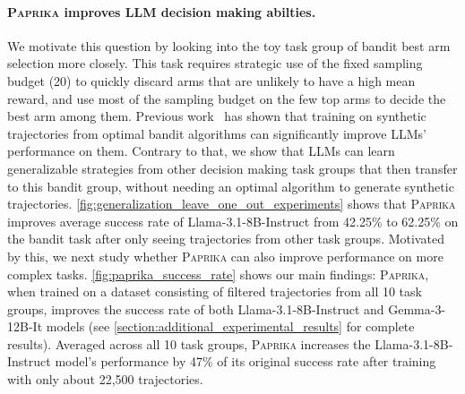 \documentclass{article}
\newcommand{\ours}[1]{\textsc{Paprika}}
\theoremstyle{plain}
\theoremstyle{definition}
\theoremstyle{remark}
\begin{document}
\paragraph{\ours{} improves LLM decision making abilties.}
We motivate this question by looking into the toy task group of bandit best arm selection more closely. This task requires strategic use of the fixed sampling budget (20) to quickly discard arms that are unlikely to have a high mean reward, and use most of the sampling budget on the few top arms to decide the best arm among them. Previous work~\citep{nie2024evolveevaluatingoptimizingllms} has shown that training on synthetic trajectories from optimal bandit algorithms can significantly improve LLMs' performance on them. Contrary to that, we show that LLMs can learn generalizable strategies from other decision making task groups that then transfer to this bandit group, without needing an optimal algorithm to generate synthetic trajectories. \cref{fig:generalization_leave_one_out_experiments} shows that \ours{} improves average success rate of Llama-3.1-8B-Instruct from 42.25\% to 62.25\% on the bandit task after only seeing trajectories from other task groups.
Motivated by this, we next study whether \ours{} can also improve performance on more complex tasks. \cref{fig:paprika_success_rate} shows our main findings: \ours{}, when trained on a dataset consisting of filtered trajectories from all 10 task groups, improves the success rate of both Llama-3.1-8B-Instruct and Gemma-3-12B-It models (see \cref{section:additional_experimental_results} for complete results).
Averaged across all 10 task groups, \ours{} increases the Llama-3.1-8B-Instruct model's performance by 47\% of its original success rate after training with only about 22,500 trajectories.
\end{document}
